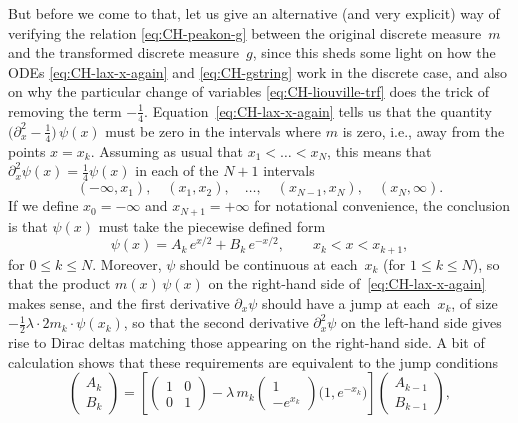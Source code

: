 \documentclass[10pt,a4paper]{article} \pdfoutput=1 
\begin{document}
But before we come to that, let us give an alternative (and very explicit) way of verifying
the relation \eqref{eq:CH-peakon-g} between the original discrete measure~$m$ and the transformed discrete
measure~$g$,
since this sheds some light on how the ODEs \eqref{eq:CH-lax-x-again} and \eqref{eq:CH-gstring}
work in the discrete case, and also on why the particular change of variables \eqref{eq:CH-liouville-trf}
does the trick of removing the term $-\tfrac14$.
Equation~\eqref{eq:CH-lax-x-again} tells us that the quantity
$\bigl( \partial_x^2 - \tfrac14 \bigr) \, \psi(x)$
must be zero in the intervals where $m$ is zero,
i.e., away from the points $x = x_k$.
Assuming as usual that $x_1 < \dots < x_N$,
this means that $\partial_x^2 \psi(x) = \tfrac14 \psi(x)$
in each of the $N+1$ intervals
\begin{equation*}
  (-\infty,x_1)
  ,\quad
  (x_1,x_2)
  ,\quad
  \ldots
  ,\quad
  (x_{N-1},x_N)
  ,\quad
  (x_N,\infty)
  .
\end{equation*}
If we define $x_0 = -\infty$ and $x_{N+1} = +\infty$ for notational convenience,
the conclusion is that $\psi(x)$ must take the piecewise defined form
\begin{equation}
  \label{eq:CH-psi-piecewise}
  \psi(x) = A_k \, e^{x/2} + B_k \, e^{-x/2}
  ,\qquad
  x_k < x < x_{k+1}
  ,
\end{equation}
for $0 \le k \le N$.
Moreover, $\psi$ should be continuous at each~$x_k$ (for $1 \le k \le N$),
so that the product $m(x) \, \psi(x)$ on the right-hand side
of~\eqref{eq:CH-lax-x-again} makes sense,
and the first derivative $\partial_x \psi$ should have a jump at each~$x_k$,
of size $-\tfrac12 \lambda \cdot 2 m_k \cdot \psi(x_k)$,
so that the second derivative $\partial_x^2 \psi$ on the left-hand side gives rise to
Dirac deltas matching those appearing on the right-hand side.
A bit of calculation shows that these requirements are equivalent to the jump conditions
\begin{equation}
  \label{eq:CH-jump-relation-psi}
  \begin{pmatrix}
    A_k \\ B_k
  \end{pmatrix}
  =
  \left[
    \begin{pmatrix} 1 & 0 \\ 0 & 1 \end{pmatrix}
    - \lambda \, m_k
    \begin{pmatrix} 1 \\ -e^{x_k} \end{pmatrix}
    \bigl( 1, e^{-x_k} \bigr)
  \right]
  \begin{pmatrix}
    A_{k-1} \\ B_{k-1}
  \end{pmatrix}
  ,
\end{equation}
\end{document}
